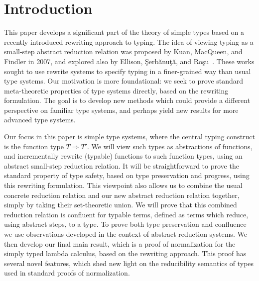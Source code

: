 \documentclass{LMCS}
\newcommand{\To}[0]{\Rightarrow}
\begin{document}
\section{Introduction}
\label{sec:intro}

This paper develops a significant part of the theory of simple types
based on a recently introduced rewriting approach to typing.  The idea
of viewing typing as a small-step abstract reduction relation was
proposed by Kuan, MacQueen, and Findler in 2007, and explored also by
Ellison, \c{S}erb\u{a}nu\c{t}\u{a}, and
Ro\c{s}u~\cite{rosu+10,ellison+08,kuan+07}.  These works sought to use
rewrite systems to specify typing in a finer-grained way than usual
type systems.  Our motivation is more foundational: we seek to prove
standard meta-theoretic properties of type systems directly, based on
the rewriting formulation.  The goal is to develop new methods which
could provide a different perspective on familiar type systems, and
perhaps yield new results for more advanced type systems.

Our focus in this paper is simple type systems, where the central
typing construct is the function type $T \To T'$.  We will view such
types as abstractions of functions, and incrementally rewrite
(typable) functions to such function types, using an abstract
small-step reduction relation.  It will be straightforward to prove
the standard property of type safety, based on type preservation and
progress, using this rewriting formulation.  This viewpoint also
allows us to combine the usual concrete reduction relation and our new
abstract reduction relation together, simply by taking their
set-theoretic union.  We will prove that this combined reduction
relation is confluent for typable terms, defined as terms which
reduce, using abstract steps, to a type.  To prove both type preservation 
and confluence we use observations developed in the context of abstract
reduction systems.  We then develop our final main result, which is a
proof of normalization for the simply typed lambda calculus, based on
the rewriting approach.  This proof has several novel features, which
shed new light on the reducibility semantics of types used in standard
proofs of normalization.
\end{document}
